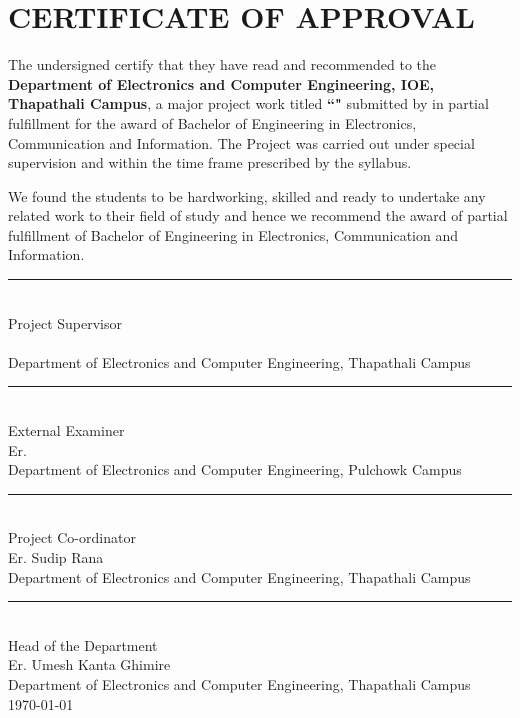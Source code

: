 \section*{CERTIFICATE OF APPROVAL}
    The undersigned certify that they have read and recommended to the \textbf{Department of Electronics and Computer Engineering, IOE, Thapathali Campus}, a major project work titled \textbf{``\titlename"} submitted by \textbf{\authornames} in partial fulfillment for the award of Bachelor of Engineering in Electronics, Communication and Information. The Project was carried out under special supervision and within the time frame prescribed by the syllabus.
    
    We found the students to be hardworking, skilled and ready to undertake any related work to their field of study and hence we recommend the award of partial fulfillment of Bachelor of Engineering in Electronics, Communication and Information. \\
    
    \rule{0.5\linewidth}{0.4pt}\\
    Project Supervisor\\
    \supervisorname\\
    Department of Electronics and Computer Engineering, Thapathali Campus\\

    \rule{0.5\linewidth}{0.4pt} \\
    External Examiner \\
    Er. \\
    Department of Electronics and Computer Engineering, Pulchowk Campus\\

    \rule{0.5\linewidth}{0.4pt} \\
    Project Co-ordinator\\
    Er. Sudip Rana \\
    Department of Electronics and Computer Engineering, Thapathali Campus\\

    \rule{0.5\linewidth}{0.4pt} \\
    Head of the Department \\ 
    Er. Umesh Kanta Ghimire \\ 
    Department of Electronics and Computer Engineering, Thapathali Campus\\

    \today
